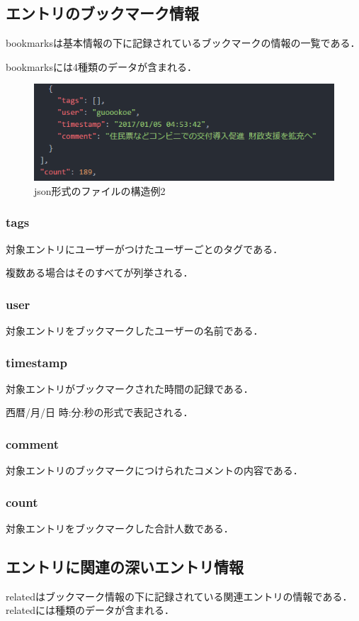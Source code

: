 \subsection{エントリのブックマーク情報}
bookmarksは基本情報の下に記録されているブックマークの情報の一覧である．\par
bookmarksには4種類のデータが含まれる．

\begin{figure}[htb]
\centering
\includegraphics[width=13cm]{json2.PNG}
\caption{json形式のファイルの構造例2}\label{json2}
\end{figure}

\subsubsection{tags}
対象エントリにユーザーがつけたユーザーごとのタグである．\par
複数ある場合はそのすべてが列挙される．
\subsubsection{user}
対象エントリをブックマークしたユーザーの名前である．
\subsubsection{timestamp}
対象エントリがブックマークされた時間の記録である．\par
西暦/月/日 時:分:秒の形式で表記される．
\subsubsection{comment}
対象エントリのブックマークにつけられたコメントの内容である．
\subsubsection{count}
対象エントリをブックマークした合計人数である．

\newpage
\subsection{エントリに関連の深いエントリ情報}
relatedはブックマーク情報の下に記録されている関連エントリの情報である．
relatedには種類のデータが含まれる．

